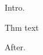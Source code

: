 \documentclass{article}\newtheorem{thm}{Theorem}\newenvironment{foo}{\par}{\par}
\begin{document}
Intro.

\begin{foo}\thm Thm text\end{foo} After.
\end{document}
